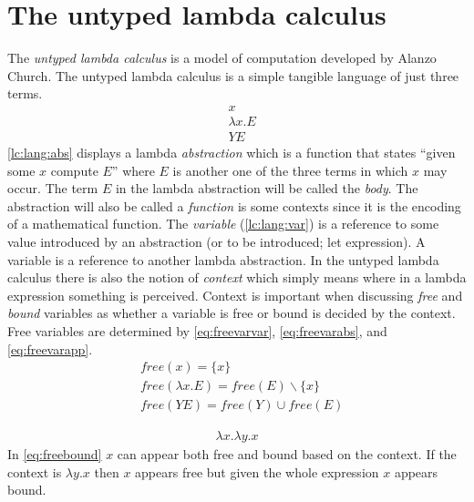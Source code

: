 \clearpage
\section{The untyped lambda calculus}\label{sec:lc}
The \textit{untyped lambda calculus} is a model of computation developed by Alanzo Church\cite{church1936unsolvable}.
The untyped lambda calculus is a simple tangible language of just three terms.
\begin{align}
  &x
  \label{lc:lang:var}\\
  &\lambda x . E
  \label{lc:lang:abs}\\
  &Y E
  \label{lc:lang:app}
\end{align}
\autoref{lc:lang:abs} displays a lambda \textit{abstraction} which is a function that states ``given some $x$ compute $E$'' where $E$ is another one of the three terms in which $x$ may occur.
The term $E$ in the lambda abstraction will be called the \textit{body}.
The abstraction will also be called a \textit{function} is some contexts since it is the encoding of a mathematical function.
The \textit{variable} (\autoref{lc:lang:var}) is a reference to some value introduced by an abstraction (or to be introduced; let expression).
A variable is a reference to another lambda abstraction.
In the untyped lambda calculus there is also the notion of \textit{context} which simply means where in a lambda expression something is perceived.
Context is important when discussing \textit{free} and \textit{bound} variables as whether a variable is free or bound is decided by the context.
Free variables are determined by \autoref{eq:freevarvar}, \autoref{eq:freevarabs}, and \autoref{eq:freevarapp}.
\begin{align}
    \label{eq:freevarvar}
    &\textit{free}(x) = \{ x \}\\
    \label{eq:freevarabs}
    &\textit{free}(\lambda x . E) = \textit{free}(E) \backslash \{ x \}\\
    \label{eq:freevarapp}
    &\textit{free}(Y E) = \textit{free}(Y) \cup \textit{free}(E)
\end{align}
\begin{exmp}
    \begin{align}
        \lambda x . \lambda y . x\label{eq:freebound}
    \end{align}
    In \autoref{eq:freebound} $x$ can appear both free and bound based on the context.
    If the context is $\lambda y . x$ then $x$ appears free but given the whole expression $x$ appears bound.
\end{exmp}

